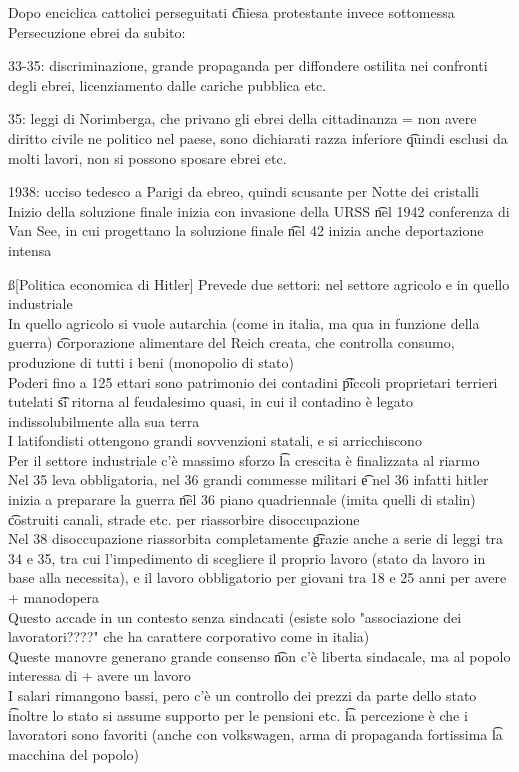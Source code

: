 \documentclass[12pt]{article}
\begin{document}
Dopo enciclica cattolici perseguitati \t chiesa protestante invece sottomessa \\
Persecuzione ebrei da subito:
\bi
  \item 33-35: discriminazione, grande propaganda per diffondere ostilita nei confronti degli ebrei, licenziamento dalle cariche pubblica etc.
  \item 35: leggi di Norimberga, che privano gli ebrei della cittadinanza = non avere diritto civile ne politico nel paese, sono dichiarati razza inferiore \t quindi esclusi da molti lavori, non si possono sposare ebrei etc.
  \item 1938: ucciso tedesco a Parigi da ebreo, quindi scusante per Notte dei cristalli
\ei
Inizio della soluzione finale inizia con invasione della URSS \t nel 1942 conferenza di Van See, in cui progettano la soluzione finale \t nel 42 inizia anche deportazione intensa

\ss[Politica economica di Hitler]
Prevede due settori: nel settore agricolo e in quello industriale \\
In quello agricolo si vuole autarchia (come in italia, ma qua in funzione della guerra) \t corporazione alimentare del Reich creata, che controlla consumo, produzione di tutti i beni (monopolio di stato) \\
Poderi fino a 125 ettari sono patrimonio dei contadini \t piccoli proprietari terrieri tutelati \t si ritorna al feudalesimo quasi, in cui il contadino è legato indissolubilmente alla sua terra \\
I latifondisti ottengono grandi sovvenzioni statali, e si arricchiscono \\
Per il settore industriale c'è massimo sforzo \t la crescita è finalizzata al riarmo \\
Nel 35 leva obbligatoria, nel 36 grandi commesse militari \t e nel 36 infatti hitler inizia a preparare la guerra \t nel 36 piano quadriennale (imita quelli di stalin) \t costruiti canali, strade etc. per riassorbire disoccupazione \\
Nel 38 disoccupazione riassorbita completamente \t grazie anche a serie di leggi tra 34 e 35, tra cui l'impedimento di scegliere il proprio lavoro (stato da lavoro in base alla necessita), e il lavoro obbligatorio per giovani tra 18 e 25 anni per avere + manodopera \\
Questo accade in un contesto senza sindacati (esiste solo "associazione dei lavoratori????" che ha carattere corporativo come in italia) \\
Queste manovre generano grande consenso \t non c'è liberta sindacale, ma al popolo interessa di + avere un lavoro \\
I salari rimangono bassi, pero c'è un controllo dei prezzi da parte dello stato \t inoltre lo stato si assume supporto per le pensioni etc. \t la percezione è che i lavoratori sono favoriti (anche con volkswagen, arma di propaganda fortissima \t la macchina del popolo)
\end{document}
